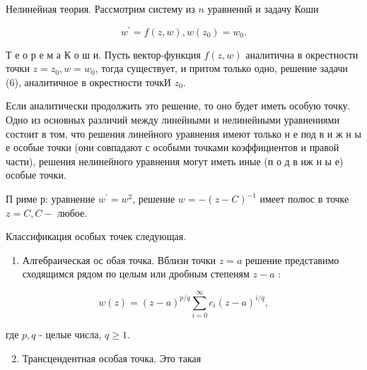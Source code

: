 \documentclass[10pt]{article}
\begin{document}
Нелинейная теория. Рассмотрим систему из $n$ уравнений и задачу Коши



\[

w^{\prime}=f(z, w), w\left(z_{0}\right)=w_{0} .

\]



Т е о р е м а К о ш и. Пусть вектор-функция $f(z, w)$ аналитична в окрестности точки $z=z_{0}, w=w_{0}$, тогда существует, и притом только одно, решение задачи (6), аналитичное в окрестности точкИ $z_{0}$.



Если аналитически продолжить это решение, то оно будет иметь особую точку. Одно из основных различий между линейными и нелинейными уравнениями состоит в том, что решения линейного уравнения имеют только н е под в и ж н ы е особые точки (они совпадают с особыми точками коэффициентов и правой части), решения нелинейного уравнения могут иметь иные (п о д в иж н ы е) особые точки.



П риме р: уравнение $w^{\prime}=w^{2}$, решение $w=-(z-C)^{-1}$ имеет полюс в точке $z=C, C-$ любое.



Классификация особых точек следующая.



\begin{enumerate}

  \item Алгебраическая ос обая точка. Вблизи точки $z=a$ решение представимо сходящимся рядом по целым или дробным степеням $z-a$ :

\end{enumerate}



\[

w(z)=(z-a)^{p / q} \sum_{i=0}^{\infty} c_{i}(z-a)^{i / q},

\]



где $p, q$ - целые числа, $q \geqslant 1$.



\begin{enumerate}

  \setcounter{enumi}{1}

  \item Трансцендентная особая точка. Это такая

\end{enumerate}
\end{document}
